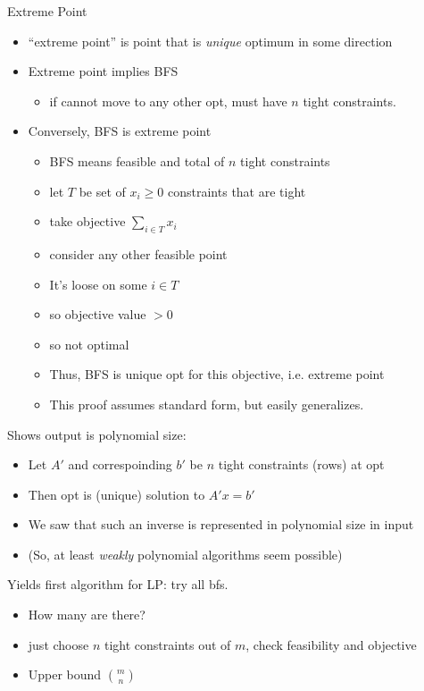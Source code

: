 \documentclass{article}
\begin{document}
Extreme Point
\begin{itemize}
\item ``extreme point'' is point that is \emph{unique} optimum in some
direction 
\item Extreme point implies BFS
\begin{itemize}
\item if cannot move to any other opt, must have $n$ tight constraints.
\end{itemize}
\item Conversely, BFS is extreme point
\begin{itemize}
\item BFS means feasible and total of $n$ tight constraints
\item let $T$ be set of $x_i \ge 0$ constraints that are tight
\item take objective $\sum_{i \in T} x_i$
\item consider any other feasible point
\item It's loose on some $i \in T$
\item so objective value $>0$
\item so not optimal
\item Thus, BFS is unique opt for this objective, i.e. extreme point
\item This proof assumes standard form, but easily generalizes.
\end{itemize}
\end{itemize}

Shows output is polynomial size:
\begin{itemize}
\item Let $A'$ and correspoinding $b'$ be $n$ tight constraints (rows)
at opt
\item Then opt is (unique) solution to $A'x=b'$
\item We saw that such an inverse is represented in
polynomial size in input
\item (So, at least \emph{weakly} polynomial algorithms seem possible)
\end{itemize}


Yields first algorithm for LP: try all bfs.
\begin{itemize}
\item How many are there?
\item just choose $n$ tight constraints out of $m$, check feasibility
  and objective
\item Upper bound $\binom{m}{n}$
\end{itemize}
\end{document}
